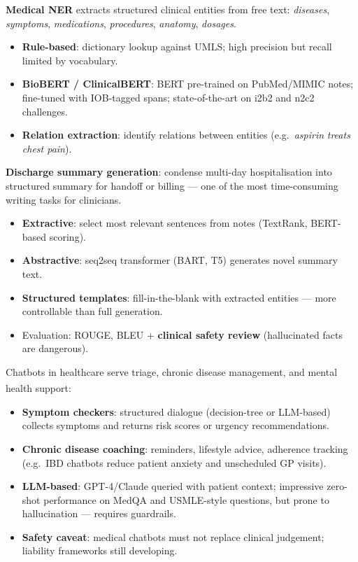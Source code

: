 \begin{tcbitemize}[ skin=sectionraster ]
    \tcbitem[title={Named Entity Recognition for Clinical Text}, raster multicolumn=3]
    \textbf{Medical NER} extracts structured clinical entities from free text: \textit{diseases}, \textit{symptoms}, \textit{medications}, \textit{procedures}, \textit{anatomy}, \textit{dosages}.
    \begin{itemize}
        \item \textbf{Rule-based}: dictionary lookup against UMLS; high precision but recall limited by vocabulary.
        \item \textbf{BioBERT / ClinicalBERT}: BERT pre-trained on PubMed/MIMIC notes; fine-tuned with IOB-tagged spans; state-of-the-art on i2b2 and n2c2 challenges.
        \item \textbf{Relation extraction}: identify relations between entities (e.g.\ \textit{aspirin} \textit{treats} \textit{chest pain}).
    \end{itemize}
    \textsuperscript{\cite[][p.~466]{juhnArtificialIntelligenceNLP2020}}

    \tcbitem[title={Clinical Summarisation}, raster multicolumn=3]
    \textbf{Discharge summary generation}: condense multi-day hospitalisation into structured summary for handoff or billing — one of the most time-consuming writing tasks for clinicians.
    \begin{itemize}
        \item \textbf{Extractive}: select most relevant sentences from notes (TextRank, BERT-based scoring).
        \item \textbf{Abstractive}: seq2seq transformer (BART, T5) generates novel summary text.
        \item \textbf{Structured templates}: fill-in-the-blank with extracted entities — more controllable than full generation.
        \item Evaluation: ROUGE, BLEU + \textbf{clinical safety review} (hallucinated facts are dangerous).
    \end{itemize}

    \tcbitem[title={Medical Chatbots and Diagnostic Support}, raster multicolumn=3]
    Chatbots in healthcare serve triage, chronic disease management, and mental health support\textsuperscript{\cite[][]{juhnArtificialIntelligenceNLP2020}}:
    \begin{itemize}
        \item \textbf{Symptom checkers}: structured dialogue (decision-tree or LLM-based) collects symptoms and returns risk scores or urgency recommendations.
        \item \textbf{Chronic disease coaching}: reminders, lifestyle advice, adherence tracking (e.g.\ IBD chatbots reduce patient anxiety and unscheduled GP visits).
        \item \textbf{LLM-based}: GPT-4/Claude queried with patient context; impressive zero-shot performance on MedQA and USMLE-style questions, but prone to hallucination — requires guardrails.
        \item \textbf{Safety caveat}: medical chatbots must not replace clinical judgement; liability frameworks still developing.
    \end{itemize}


\end{tcbitemize}
